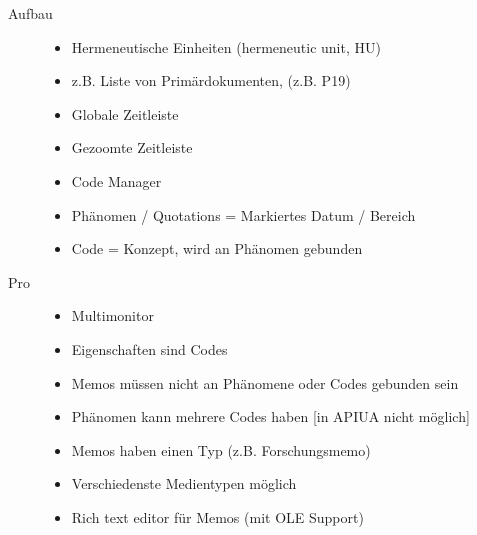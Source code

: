 \begin{description}
	\item[Aufbau] \hfill
\begin{itemize}
\itemsep1pt\parskip0pt
\item Hermeneutische Einheiten (hermeneutic unit, HU)
\item z.B. Liste von Primärdokumenten, (z.B. P19)
\item Globale Zeitleiste
\item Gezoomte Zeitleiste
\item Code Manager
\item Phänomen / Quotations = Markiertes Datum / Bereich
\item Code = Konzept, wird an Phänomen gebunden
\end{itemize}

	\item[Pro] \hfill
\begin{itemize}
\itemsep1pt\parskip0pt
\item Multimonitor
\item Eigenschaften sind Codes
\item Memos müssen nicht an Phänomene oder Codes gebunden sein
\item Phänomen kann mehrere Codes haben [in APIUA nicht möglich]
\item Memos haben einen Typ (z.B. Forschungsmemo)
\item Verschiedenste Medientypen möglich
\item Rich text editor für Memos (mit OLE Support)
\end{itemize}


\end{description}
